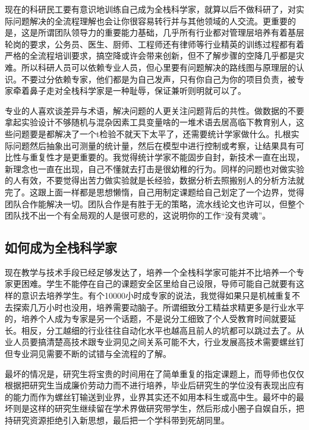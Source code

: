 \documentclass[]{book}
\begin{document}
现在的科研民工要有意识地训练自己成为全栈科学家，就算以后不做科研了，对实际问题解决的全流程理解也会让你很容易转行并与其他领域的人交流。更重要的是，这是所谓团队领导力的重要能力基础，几乎所有行业都对管理层培养有着基层轮岗的要求，公务员、医生、厨师、工程师还有律师等行业精英的训练过程都有着严格的全流程培训要求，搞空降或许会带来创新，但不了解步骤的空降几乎都是灾难。所以科研人员可以依赖专业人员，但心里要有问题解决的路线图与原理层的认识。不要过分依赖专家，他们都是为自己发声，只有你自己为你的项目负责，被专家牵着鼻子走对全栈科学家是一种耻辱，保证兼听则明就可以了。

专业的人喜欢谈差异与术语，解决问题的人更关注问题背后的共性。做数据的不要拿起实验设计不够随机与混杂因素工具变量啥的一堆术语去居高临下教育别人，这些问题要是都解决了一个t检验不就天下太平了，还需要统计学家做什么。扎根实际问题然后抽象出可测量的统计量，然后在模型中进行控制或考察，让结果具有可比性与重复性才是更重要的。我觉得统计学家不能固步自封，新技术一直在出现，新理念也一直在出现，自己不懂就去打击是很幼稚的行为。同样的问题也对做实验的人有效，不要觉得出苦力做实验就是长经验，数据分析去照搬别人的分析方法就完了。这跟上面一样都是思想懒惰，自己用制定课题给自己划定了一个边界，觉得团队合作能解决一切。团队合作是有胜于无的策略，流水线论文也许可以，但整个团队找不出一个有全局观的人是很可悲的，这说明你的工作``没有灵魂''。

\hypertarget{ux5982ux4f55ux6210ux4e3aux5168ux6808ux79d1ux5b66ux5bb6}{%
\subsection{如何成为全栈科学家}\label{ux5982ux4f55ux6210ux4e3aux5168ux6808ux79d1ux5b66ux5bb6}}

现在教学与技术手段已经足够发达了，培养一个全栈科学家可能并不比培养一个专家更困难。学生不能停在自己的课题安全区里给自己设限，导师可能自己就要有这样的意识去培养学生。有个10000小时成专家的说法，我觉得如果只是机械重复不去探索几万小时也没用，培养需要动脑子。所谓细致分工精益求精更多是行业水平的，培养个人成为专家是另一个话题，不是说分工细致了个人受教育时间就要延长。相反，分工越细的行业往往自动化水平也越高且前人的坑都可以跳过去了。从业人员要搞清楚高技术跟专业洞见之间关系可能不大，行业发展高技术需要螺丝钉但专业洞见需要不断的试错与全流程的了解。

最坏的情况是，研究生将宝贵的时间用在了简单重复的指定课题上，而导师也仅仅根据把研究生当成廉价劳动力而不进行培养，毕业后研究生的学位没有表现出应有的能力而作为螺丝钉输送到业界，业界其实还不如用本科生或高中生。最坏中的最坏则是这样的研究生继续留在学术界做研究带学生，然后形成小圈子自娱自乐，把持研究资源拒绝引入新思想，最后把一个学科带到死胡同里。
\end{document}

